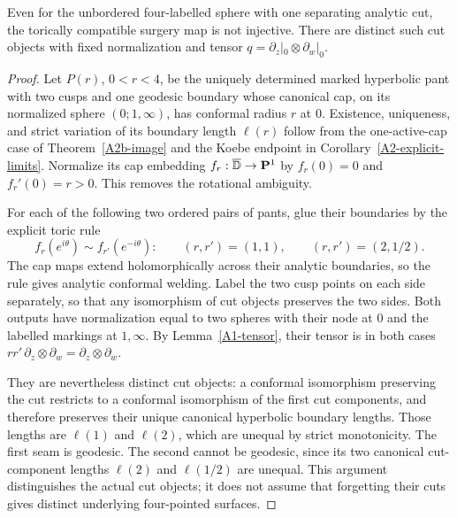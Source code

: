 \begin{proposition}
\label{A1-toric-noninjective}
Even for the unbordered four-labelled sphere with one separating
analytic cut, the torically compatible surgery map is not
injective. There are distinct such cut objects with fixed
normalization and tensor $q=\partial_z|_0\otimes\partial_w|_0$.
\end{proposition}
\begin{proof}
Let $P(r)$, $0<r<4$, be the uniquely determined marked hyperbolic
pant with two cusps and one geodesic boundary whose canonical cap,
on its normalized sphere $(0;1,\infty)$, has conformal radius $r$
at $0$. Existence, uniqueness, and strict variation of its
boundary length $\ell(r)$ follow from the one-active-cap case of
Theorem~\ref{A2b-image} and the Koebe endpoint in
Corollary~\ref{A2-explicit-limits}. Normalize its cap embedding
$f_r:\overline{{\mathbb{D}}}\to\mathbf P^1$ by $f_r(0)=0$ and
$f_r'(0)=r>0$. This removes the rotational ambiguity.

For each of the following two ordered pairs of pants, glue their
boundaries by the explicit toric rule
\[
 f_r(e^{i\theta})\sim f_{r'}(e^{-i\theta}):
 \qquad (r,r')=(1,1),\qquad (r,r')=(2,1/2).
\]
The cap maps extend holomorphically across their analytic boundaries,
so the rule gives analytic conformal welding. Label the two cusp
points on each side separately, so that any isomorphism of cut
objects preserves the two sides. Both outputs have normalization
equal to two spheres with their node at $0$ and the labelled
markings at $1,\infty$. By Lemma~\ref{A1-tensor}, their tensor is
in both cases $rr'\,\partial_z\otimes\partial_w
=\partial_z\otimes\partial_w$.

They are nevertheless distinct cut objects: a conformal
isomorphism preserving the cut restricts to a conformal isomorphism
of the first cut components, and therefore preserves their unique
canonical hyperbolic boundary lengths. Those lengths are
$\ell(1)$ and $\ell(2)$, which are unequal by strict monotonicity.
The first seam is geodesic. The second cannot be geodesic, since
its two canonical cut-component lengths $\ell(2)$ and $\ell(1/2)$
are unequal. This argument distinguishes the actual cut objects;
it does not assume that forgetting their cuts gives distinct
underlying four-pointed surfaces.
\end{proof}

